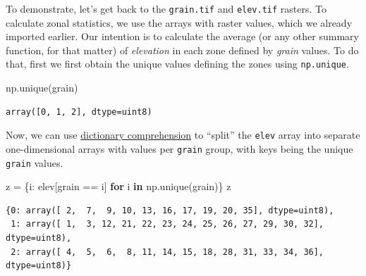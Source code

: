 \documentclass[
  letterpaper,
]{krantz}
\newenvironment{Shaded}{\begin{snugshade}}{\end{snugshade}}
\newcommand{\ControlFlowTok}[1]{\textcolor[rgb]{0.00,0.23,0.31}{\textbf{#1}}}
\newcommand{\KeywordTok}[1]{\textcolor[rgb]{0.00,0.23,0.31}{\textbf{#1}}}
\newcommand{\NormalTok}[1]{\textcolor[rgb]{0.00,0.23,0.31}{#1}}
\newcommand{\OperatorTok}[1]{\textcolor[rgb]{0.37,0.37,0.37}{#1}}
\begin{document}
To demonstrate, let's get back to the \texttt{grain.tif} and
\texttt{elev.tif} rasters. To calculate zonal statistics, we use the
arrays with raster values, which we already imported earlier. Our
intention is to calculate the average (or any other summary function,
for that matter) of \emph{elevation} in each zone defined by
\emph{grain} values. To do that, first we first obtain the unique values
defining the zones using \texttt{np.unique}.

\begin{Shaded}
\begin{Highlighting}[]
\NormalTok{np.unique(grain)}
\end{Highlighting}
\end{Shaded}

\begin{verbatim}
array([0, 1, 2], dtype=uint8)
\end{verbatim}

Now, we can use
\href{https://docs.python.org/3/tutorial/datastructures.html\#dictionaries}{dictionary
comprehension} to ``split'' the \texttt{elev} array into separate
one-dimensional arrays with values per \texttt{grain} group, with keys
being the unique \texttt{grain} values.

\begin{Shaded}
\begin{Highlighting}[]
\NormalTok{z }\OperatorTok{=}\NormalTok{ \{i: elev[grain }\OperatorTok{==}\NormalTok{ i] }\ControlFlowTok{for}\NormalTok{ i }\KeywordTok{in}\NormalTok{ np.unique(grain)\}}
\NormalTok{z}
\end{Highlighting}
\end{Shaded}

\begin{verbatim}
{0: array([ 2,  7,  9, 10, 13, 16, 17, 19, 20, 35], dtype=uint8),
 1: array([ 1,  3, 12, 21, 22, 23, 24, 25, 26, 27, 29, 30, 32], dtype=uint8),
 2: array([ 4,  5,  6,  8, 11, 14, 15, 18, 28, 31, 33, 34, 36], dtype=uint8)}
\end{verbatim}
\end{document}
